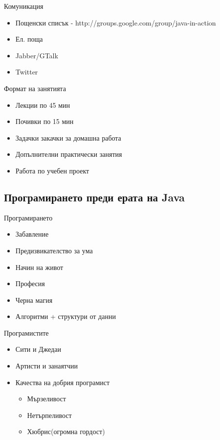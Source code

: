 \documentclass{beamer}
\begin{document}
\begin{frame}{Комуникация}
  \transdissolve
  \begin{itemize}
  \item Пощенски списък - http://groups.google.com/group/java-in-action
  \item Ел. поща
  \item Jabber/GTalk
  \item Twitter
  \end{itemize}
\end{frame}

\begin{frame}{Формат на занятията}
  \transdissolve
  \begin{itemize}
  \item Лекции по 45 мин
  \item Почивки по 15 мин
  \item Задачки закачки за домашна работа
  \item Допълнителни практически занятия
  \item Работа по учебен проект
  \end{itemize}
\end{frame}

\subsection{Програмирането преди ерата на Java}

\begin{frame}{Програмирането}
  \transdissolve
  \begin{itemize}
  \item Забавление
  \item Предизвикателство за ума
  \item Начин на живот
  \item Професия
  \item Черна магия
  \item Алгоритми + структури от данни
  \end{itemize}
\end{frame}

\begin{frame}{Програмистите}
  \transdissolve
  \begin{itemize}
  \item Сити и Джедаи
  \item Артисти и занаятчии
  \item Качества на добрия програмист
    \begin{itemize}
      \item Мързеливост
      \item Нетърпеливост
      \item Хюбрис(огромна гордост)
    \end{itemize}

  \end{itemize}
\end{frame}
\end{document}
